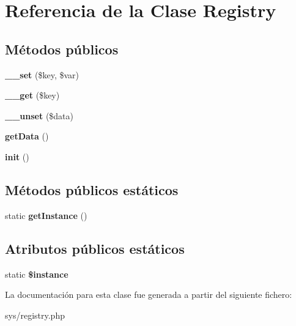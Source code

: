 \hypertarget{class_registry}{}\section{Referencia de la Clase Registry}
\label{class_registry}
\subsection*{Métodos públicos}
\begin{DoxyCompactItemize}
\item 
\hypertarget{class_registry_aa2c6e0f52eebf99a2bb4b6ba88d7b156}{}{\bfseries \+\_\+\+\_\+set} (\$key, \$var)\label{class_registry_aa2c6e0f52eebf99a2bb4b6ba88d7b156}

\item 
\hypertarget{class_registry_a4537dad3b44254124991341cc91b28fb}{}{\bfseries \+\_\+\+\_\+get} (\$key)\label{class_registry_a4537dad3b44254124991341cc91b28fb}

\item 
\hypertarget{class_registry_ab8c29e72070f8e32d1a5119fb708e5e3}{}{\bfseries \+\_\+\+\_\+unset} (\$data)\label{class_registry_ab8c29e72070f8e32d1a5119fb708e5e3}

\item 
\hypertarget{class_registry_a81a67162a6288d78fc4c55283325f0b4}{}{\bfseries get\+Data} ()\label{class_registry_a81a67162a6288d78fc4c55283325f0b4}

\item 
\hypertarget{class_registry_a4be4055f3361d4800e16bc2e2e38cda6}{}{\bfseries init} ()\label{class_registry_a4be4055f3361d4800e16bc2e2e38cda6}

\end{DoxyCompactItemize}
\subsection*{Métodos públicos estáticos}
\begin{DoxyCompactItemize}
\item 
\hypertarget{class_registry_ac93fbec81f07e5d15f80db907e63dc10}{}static {\bfseries get\+Instance} ()\label{class_registry_ac93fbec81f07e5d15f80db907e63dc10}

\end{DoxyCompactItemize}
\subsection*{Atributos públicos estáticos}
\begin{DoxyCompactItemize}
\item 
\hypertarget{class_registry_ad9d7ce33ebb142b70e58b68052ca0ea8}{}static {\bfseries \$instance}\label{class_registry_ad9d7ce33ebb142b70e58b68052ca0ea8}

\end{DoxyCompactItemize}


La documentación para esta clase fue generada a partir del siguiente fichero\+:\begin{DoxyCompactItemize}
\item 
sys/registry.\+php\end{DoxyCompactItemize}
